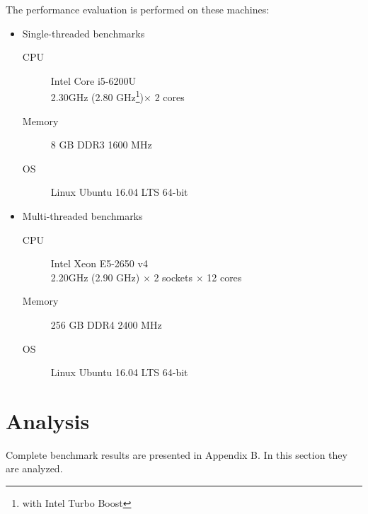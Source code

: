 \pagebreak

The performance evaluation is performed on these machines:
\begin{itemize}
\item Single-threaded benchmarks
    \begin{description}
    \item [CPU] Intel\textsuperscript{\textregistered{}} Core\textsuperscript{\texttrademark{}} i5-6200U \\
    2.30GHz (2.80 GHz\footnote{with Intel\textsuperscript{\textregistered{}} Turbo Boost})$ \times$ 2 cores
    \item [Memory] 8 GB DDR3 1600 MHz
    \item [OS] Linux\textsuperscript{\textregistered{}} Ubuntu\textsuperscript{\textregistered{}} 16.04 LTS 64-bit
    \end{description}
\item Multi-threaded benchmarks
    \begin{description}
    \item [CPU] Intel\textsuperscript{\textregistered{}} Xeon\textsuperscript{\textregistered{}} E5-2650 v4 \\
    2.20GHz (2.90 GHz\footnotemark[1]) $ \times $ 2 sockets $ \times $ 12 cores
    \item [Memory] 256 GB DDR4 2400 MHz
    \item [OS] Linux\textsuperscript{\textregistered{}} Ubuntu\textsuperscript{\textregistered{}} 16.04 LTS 64-bit
    \end{description}
\end{itemize}

\section{Analysis}
\label{sec:banalysis}

Complete benchmark results are presented in Appendix B. In this section they are analyzed.

